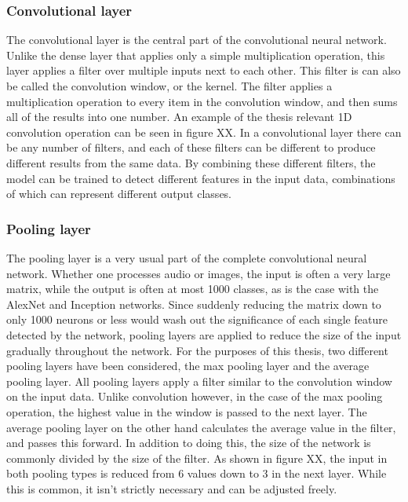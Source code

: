 \subsubsection{Convolutional layer}
The convolutional layer is the central part of the convolutional neural network.
Unlike the dense layer that applies only a simple multiplication operation, this layer applies a filter over multiple inputs next to each other. 
This filter is can also be called the convolution window, or the kernel.
The filter applies a multiplication operation to every item in the convolution window, and then sums all of the results into one number.
An example of the thesis relevant 1D convolution operation can be seen in figure XX.
In a convolutional layer there can be any number of filters, and each of these filters can be different to produce different results from the same data.
By combining these different filters, the model can be trained to detect different features in the input data, combinations of which can represent different output classes.

\subsubsection{Pooling layer}
The pooling layer is a very usual part of the complete convolutional neural network.
Whether one processes audio or images, the input is often a very large matrix, while the output is often at most 1000 classes, as is the case with the AlexNet\cite{Krizhevsky:2017:ICD:3098997.3065386} and Inception\cite{szegedy2014going} networks.
Since suddenly reducing the matrix down to only 1000 neurons or less would wash out the significance of each single feature detected by the network, pooling layers are applied to reduce the size of the input gradually throughout the network.
For the purposes of this thesis, two different pooling layers have been considered, the max pooling layer and the average pooling layer.
All pooling layers apply a filter similar to the convolution window on the input data.
Unlike convolution however, in the case of the max pooling operation, the highest value in the window is passed to the next layer.
The average pooling layer on the other hand calculates the average value in the filter, and passes this forward.
In addition to doing this, the size of the network is commonly divided by the size of the filter.
As shown in figure XX, the input in both pooling types is reduced from 6 values down to 3 in the next layer.
While this is common, it isn't strictly necessary and can be adjusted freely.

